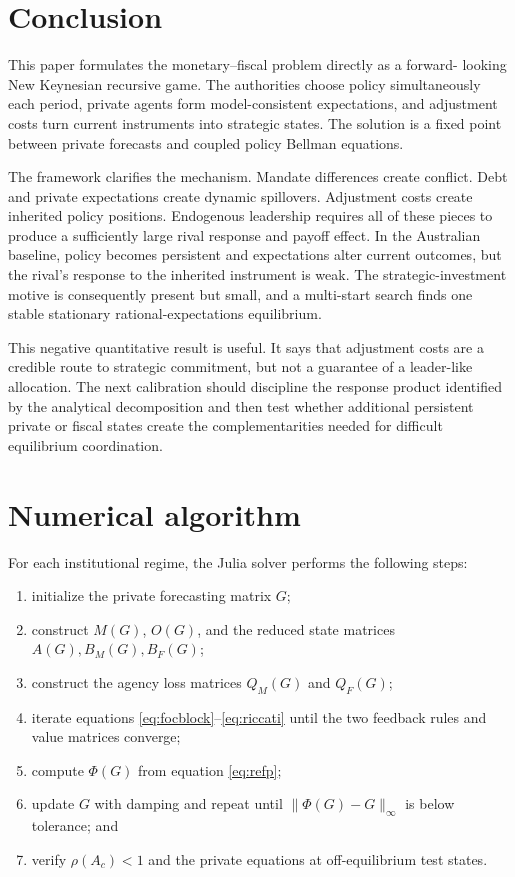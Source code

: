 \documentclass[11pt]{article}
\begin{document}
\section{Conclusion}

This paper formulates the monetary--fiscal problem directly as a forward-
looking New Keynesian recursive game. The authorities choose policy
simultaneously each period, private agents form model-consistent expectations,
and adjustment costs turn current instruments into strategic states. The
solution is a fixed point between private forecasts and coupled policy Bellman
equations.

The framework clarifies the mechanism. Mandate differences create conflict.
Debt and private expectations create dynamic spillovers. Adjustment costs
create inherited policy positions. Endogenous leadership requires all of these
pieces to produce a sufficiently large rival response and payoff effect. In
the Australian baseline, policy becomes persistent and expectations alter
current outcomes, but the rival's response to the inherited instrument is
weak. The strategic-investment motive is consequently present but small, and
a multi-start search finds one stable stationary rational-expectations
equilibrium.

This negative quantitative result is useful. It says that adjustment costs are
a credible route to strategic commitment, but not a guarantee of a leader-like
allocation. The next calibration should discipline the response product
identified by the analytical decomposition and then test whether additional
persistent private or fiscal states create the complementarities needed for
difficult equilibrium coordination.

\appendix
\section{Numerical algorithm}

For each institutional regime, the Julia solver performs the following steps:

\begin{enumerate}
  \item initialize the private forecasting matrix $G$;
  \item construct $M(G)$, $O(G)$, and the reduced state matrices
        $A(G),B_M(G),B_F(G)$;
  \item construct the agency loss matrices $Q_M(G)$ and $Q_F(G)$;
  \item iterate equations \eqref{eq:focblock}--\eqref{eq:riccati} until the
        two feedback rules and value matrices converge;
  \item compute $\Phi(G)$ from equation \eqref{eq:refp};
  \item update $G$ with damping and repeat until
        $\lVert\Phi(G)-G\rVert_\infty$ is below tolerance; and
  \item verify $\rho(A_c)<1$ and the private equations at off-equilibrium test
        states.
\end{enumerate}
\end{document}
